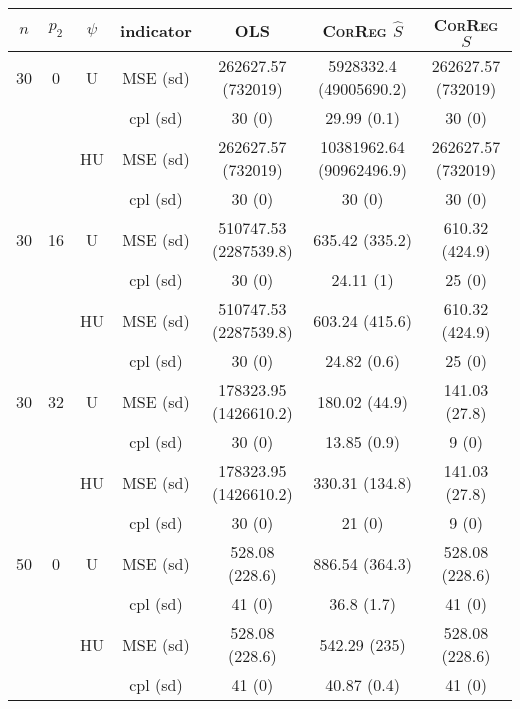 \documentclass[11pt,a4paper]{article}
\begin{document}
\begin{table}[h!]
\centering
\begin{tabular}{|c|c|c|c|c|c|c|}
\hline 
$n$ & $p_2$& $\psi$ & indicator &OLS  &    \textsc{CorReg} $\hat S$& \textsc{CorReg} $S$\\ 
\hline %
30 & 0 & U& MSE (sd) & 262627.57 (732019) & 5928332.4 (49005690.2) & 262627.57 (732019) \\
& & & cpl (sd) & 30 (0) & 29.99 (0.1) & 30 (0) \\
 &  &HU &MSE (sd) & 262627.57 (732019) & 10381962.64 (90962496.9) & 262627.57 (732019) \\
& & & cpl (sd) & 30 (0) & 30 (0) & 30 (0) \\
\hline %
30 & 16 & U&MSE (sd) & 510747.53 (2287539.8) & 635.42 (335.2) & 610.32 (424.9) \\
& & & cpl (sd) & 30 (0) & 24.11 (1) & 25 (0) \\
 &  &HU &MSE (sd) & 510747.53 (2287539.8) & 603.24 (415.6) & 610.32 (424.9) \\
& & & cpl (sd) & 30 (0) & 24.82 (0.6) & 25 (0) \\
\hline %
30 & 32 & U & MSE (sd) & 178323.95 (1426610.2) & 180.02 (44.9) & 141.03 (27.8) \\
& & & cpl (sd) & 30 (0) & 13.85 (0.9) & 9 (0) \\
 &  & HU & MSE (sd) & 178323.95 (1426610.2) & 330.31 (134.8) & 141.03 (27.8) \\
& & & cpl (sd) & 30 (0) & 21 (0) & 9 (0) \\
\hline
\hline %
50 & 0 & U&MSE (sd) & 528.08 (228.6) & 886.54 (364.3) & 528.08 (228.6) \\
& & & cpl (sd) & 41 (0) & 36.8 (1.7) & 41 (0) \\
 &  & HU &MSE (sd) & 528.08 (228.6) & 542.29 (235) & 528.08 (228.6) \\
& & & cpl (sd) & 41 (0) & 40.87 (0.4) & 41 (0) \\

\end{tabular}
\end{table}
\end{document}
